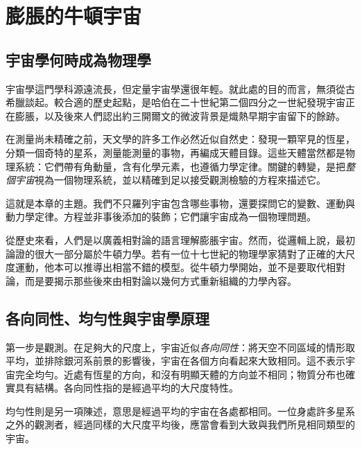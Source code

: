 \chapter{膨脹的牛頓宇宙}


\section{宇宙學何時成為物理學}

宇宙學這門學科源遠流長，但定量宇宙學還很年輕。就此處的目的而言，無須從古希臘談起。較合適的歷史起點，是哈伯在二十世紀第二個四分之一世紀發現宇宙正在膨脹，以及後來人們認出約三開爾文的微波背景是熾熱早期宇宙留下的餘跡。

在測量尚未精確之前，天文學的許多工作必然近似自然史：發現一顆罕見的恆星，分類一個奇特的星系，測量能測量的事物，再編成天體目錄。這些天體當然都是物理系統：它們帶有角動量，含有化學元素，也遵循力學定律。關鍵的轉變，是把\emph{整個宇宙}視為一個物理系統，並以精確到足以接受觀測檢驗的方程來描述它。

這就是本章的主題。我們不只羅列宇宙包含哪些事物，還要探問它的變數、運動與動力學定律。方程並非事後添加的裝飾；它們讓宇宙成為一個物理問題。

從歷史來看，人們是以廣義相對論的語言理解膨脹宇宙。然而，從邏輯上說，最初論證的很大一部分屬於牛頓力學。若有一位十七世紀的物理學家猜對了正確的大尺度運動，他本可以推導出相當不錯的模型。從牛頓力學開始，並不是要取代相對論，而是要揭示那些後來由相對論以幾何方式重新組織的力學內容。

\section{各向同性、均勻性與宇宙學原理}

第一步是觀測。在足夠大的尺度上，宇宙近似\emph{各向同性}：將天空不同區域的情形取平均，並排除銀河系前景的影響後，宇宙在各個方向看起來大致相同。這不表示宇宙完全均勻。近處有恆星的方向，和沒有明顯天體的方向並不相同；物質分布也確實具有結構。各向同性指的是經過平均的大尺度特性。

均勻性則是另一項陳述，意思是經過平均的宇宙在各處都相同。一位身處許多星系之外的觀測者，經過同樣的大尺度平均後，應當會看到大致與我們所見相同類型的宇宙。

